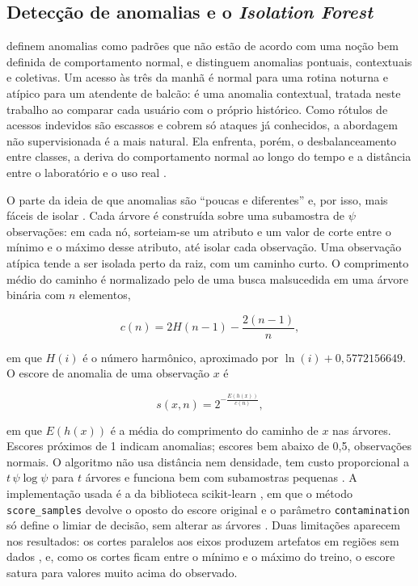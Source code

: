 \subsection{Detecção de anomalias e o \textit{Isolation Forest}}
\label{sec:anomalias-iforest}

 definem anomalias como padrões que não estão de acordo com uma noção
bem definida de comportamento normal, e distinguem anomalias pontuais, contextuais e coletivas.
Um acesso às três da manhã é normal para uma rotina noturna e atípico para um atendente de
balcão: é uma anomalia contextual, tratada neste trabalho ao comparar cada usuário com o próprio
histórico. Como rótulos de acessos indevidos são escassos e cobrem só ataques já conhecidos, a
abordagem não supervisionada é a mais natural. Ela enfrenta, porém, o desbalanceamento entre
classes, a deriva do comportamento normal ao longo do tempo \cite{gama2014} e a distância entre
o laboratório e o uso real \cite{sommer2010}.

O \iforest{} parte da ideia de que anomalias são ``poucas e diferentes'' e, por isso, mais fáceis
de isolar \cite{liu2008,liu2012}. Cada árvore é construída sobre uma subamostra de $\psi$
observações: em cada nó, sorteiam-se um atributo e um valor de corte entre o mínimo e o máximo
desse atributo, até isolar cada observação. Uma observação atípica tende a ser isolada perto da
raiz, com um caminho curto. O comprimento médio do caminho é normalizado pelo de uma busca
malsucedida em uma árvore binária com $n$ elementos,

\begin{equation}
    c(n) = 2H(n-1) - \frac{2(n-1)}{n},
    \label{eq:cn}
\end{equation}

\noindent em que $H(i)$ é o número harmônico, aproximado por $\ln(i) + 0{,}5772156649$. O escore
de anomalia de uma observação $x$ é

\begin{equation}
    s(x, n) = 2^{-\frac{E(h(x))}{c(n)}},
    \label{eq:score}
\end{equation}

\noindent em que $E(h(x))$ é a média do comprimento do caminho de $x$ nas árvores. Escores
próximos de 1 indicam anomalias; escores bem abaixo de 0,5, observações normais. O algoritmo
não usa distância nem densidade, tem custo proporcional a $t\,\psi \log \psi$ para $t$ árvores e
funciona bem com subamostras pequenas \cite{liu2012}. A implementação usada é a da biblioteca
scikit-learn \cite{pedregosa2011}, em que o método \texttt{score\_samples} devolve o oposto do
escore original e o parâmetro \texttt{contamination} só define o limiar de decisão, sem alterar
as árvores \cite{scikitlearn2026}. Duas limitações aparecem nos resultados: os cortes paralelos
aos eixos produzem artefatos em regiões sem dados \cite{hariri2021}, e, como os cortes ficam entre
o mínimo e o máximo do treino, o escore satura para valores muito acima do observado.

